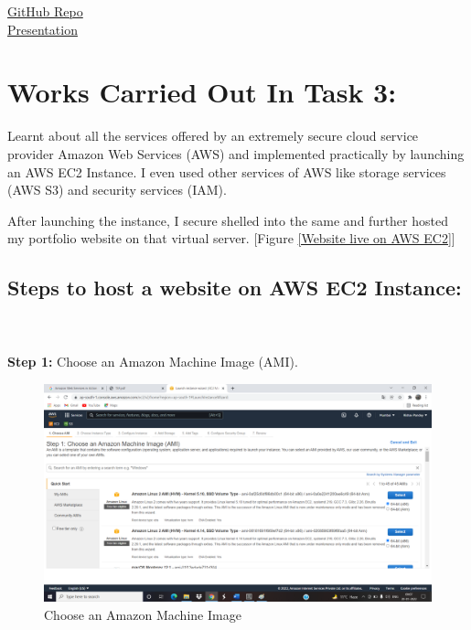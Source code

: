 \documentclass[12pt]{article}
\begin{document}
\href{https://github.com/rishavpandey160999/Euro-2-INR-Converter}{GitHub Repo}\\

\href{https://youtu.be/AC3TEC7_Bi4}{Presentation}



\clearpage

\section{Works Carried Out In Task 3:}
Learnt about all the services offered by an extremely secure cloud service provider Amazon Web Services (AWS) and implemented practically by launching an AWS EC2 Instance. I even used other services of AWS like storage services (AWS S3) and security services (IAM).

After launching the instance, I secure shelled into the same and further hosted my portfolio website on that virtual server. [Figure \ref{Website live on AWS EC2}]

\subsection{Steps to host a website on AWS EC2 Instance:}\cite{mishra2017amazon}\\
\\
\textbf{Step 1:} Choose an Amazon Machine Image (AMI).
\begin{figure}[h]
\centering
\includegraphics[scale=0.3]{Untitled6.png}
\caption{Choose an Amazon Machine Image}
\label{Choose an Amazon Machine Image}
\end{figure}
\clearpage
\end{document}
